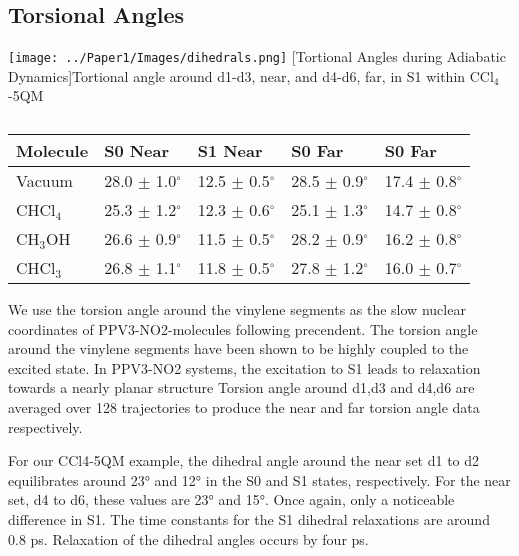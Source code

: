 \subsection{Torsional Angles}

\noindent
\begin{minipage}[c]{\textwidth}
  \centering
  \texttt{[image: ../Paper1/Images/dihedrals.png]}
  [Tortional Angles during Adiabatic Dynamics]{Tortional angle around d1-d3, near, and d4-d6, far, in S1 within CCl\(_4\)-5QM}
  \label{dihedralAdiabatic}
\end{minipage}\bigskip

\begin{table}[H]
  \caption[]{}
  \begin{tabularx}{\textwidth}{XXXXX}\hline
    Molecule    & S0 Near  & S1 Near & S0 Far & S0 Far\\\hline
    Vacuum      & 28.0 \(\pm\) 1.0\(^\circ\) & 12.5 \(\pm\) 0.5\(^\circ\) & 28.5 \(\pm\) 0.9\(^\circ\) & 17.4 \(\pm\) 0.8\(^\circ\)\\
    CHCl\(_4\)  & 25.3 \(\pm\) 1.2\(^\circ\)  & 12.3 \(\pm\) 0.6\(^\circ\) & 25.1 \(\pm\) 1.3\(^\circ\) & 14.7 \(\pm\) 0.8\(^\circ\)\\
    CH\(_3\)OH  & 26.6 \(\pm\) 0.9\(^\circ\)  & 11.5 \(\pm\) 0.5\(^\circ\) & 28.2 \(\pm\) 0.9\(^\circ\) & 16.2 \(\pm\) 0.8\(^\circ\)\\
    CHCl\(_3\)  & 26.8 \(\pm\) 1.1\(^\circ\)  & 11.8 \(\pm\) 0.5\(^\circ\) & 27.8 \(\pm\) 1.2\(^\circ\) & 16.0 \(\pm\) 0.7\(^\circ\)\\\hline
  \end{tabularx}
\end{table}

We use the torsion angle around the vinylene segments as the slow nuclear coordinates of PPV3-NO2-molecules following precendent. \cite{Clark2012}
The torsion angle around the vinylene segments have been shown to be highly coupled to the excited state.\cite{nelson2011nonadiabatic,panda2013electronically}
In PPV3-NO2 systems, the excitation to S1 leads to relaxation towards a nearly planar structure Torsion angle around d1,d3 and d4,d6 are averaged over 128 trajectories to produce the near and far torsion angle data respectively. \cite{barford2011ultrafast}

For our CCl4-5QM example, the dihedral angle around the near set d1 to d2 equilibrates around 23° and 12° in the S0 and S1 states, respectively.
For the near set, d4 to d6, these values are 23° and 15°.
Once again, only a noticeable difference in S1.
The time constants for the S1 dihedral relaxations are around 0.8 ps.
Relaxation of the dihedral angles occurs by four ps. 

